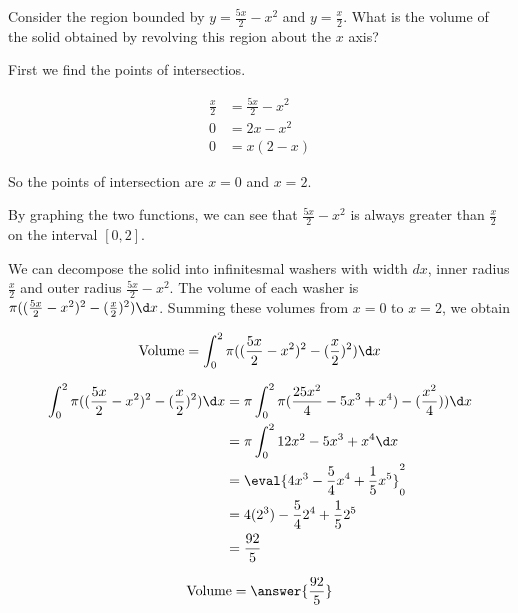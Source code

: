\documentclass{ximera}
\author{Steven Gubkin}
\begin{document}
\begin{exercise}



Consider the region bounded by $y = \frac{5x}{2}-x^2$ and $y=\frac{x}{2}$.  What is the volume of the solid obtained by revolving this region about the $x$ axis?

\begin{hint}
	First we find the points of intersectios.
	
	\begin{align*}
	\frac{x}{2} &= \frac{5x}{2}-x^2\\
	0 &= 2x-x^2\\
	0&= x(2-x)
	\end{align*}

	So the points of intersection are $x=0$ and $x=2$.
\end{hint}

\begin{hint}
	By graphing the two functions, we can see that $\frac{5x}{2}-x^2$ is always greater than $\frac{x}{2}$ on the interval $[0,2]$.
\end{hint}

\begin{hint}
	We can decompose the solid into infinitesmal washers with width $dx$, inner radius $\frac{x}{2}$ and outer radius $\frac{5x}{2}-x^2$.  The volume of each washer is $\pi((\frac{5x}{2}-x^2)^2-(\frac{x}{2})^2)\d x$.  Summing these volumes from $x=0$ to $x=2$, we obtain

	\[
	\textrm{Volume} = \int_0^2 \pi((\frac{5x}{2}-x^2)^2-(\frac{x}{2})^2) \d x
	\]
\end{hint}

\begin{hint}
	\begin{align*}
		\int_0^2 \pi((\frac{5x}{2}-x^2)^2-(\frac{x}{2})^2) \d x&= \pi \int_0^2 \pi(\frac{25x^2}{4}-5x^3+x^4)-(\frac{x^2}{4})) \d x\\
		&=\pi \int_0^2 12x^2-5x^3+x^4 \d x\\
		&= \eval{4x^3-\frac{5}{4}x^4+\frac{1}{5}x^5}_0^2\\
		&=4(2^3)-\frac{5}{4}2^4+\frac{1}{5}2^5\\
		&=\frac{92}{5}
	\end{align*}
\end{hint}

\begin{prompt}
	\[
		\textrm{Volume} = \answer{\frac{92}{5}}
	\]
\end{prompt}

\end{exercise}
\end{document}

